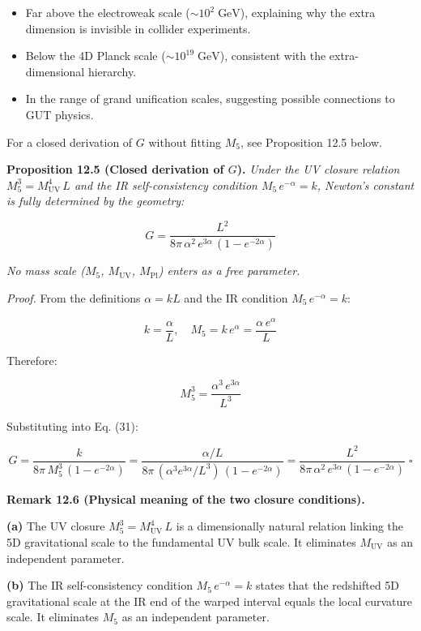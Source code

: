 \documentclass[
  11pt,
]{article}
\providecommand{\tightlist}{%
  \setlength{\itemsep}{0pt}\setlength{\parskip}{0pt}}
\begin{document}
\begin{itemize}
\tightlist
\item
  Far above the electroweak scale (\(\sim 10^2\;\text{GeV}\)),
  explaining why the extra dimension is invisible in collider
  experiments.
\item
  Below the 4D Planck scale (\(\sim 10^{19}\;\text{GeV}\)), consistent
  with the extra-dimensional hierarchy.
\item
  In the range of grand unification scales, suggesting possible
  connections to GUT physics.
\end{itemize}

For a closed derivation of \(G\) without fitting \(M_5\), see
Proposition 12.5 below.

\textbf{Proposition 12.5 (Closed derivation of \(G\)).} \emph{Under the
UV closure relation \(M_5^3 = M_{\text{UV}}^4\,L\) and the IR
self-consistency condition \(M_5\,e^{-\alpha} = k\), Newton's constant
is fully determined by the geometry:}

\[\boxed{G = \frac{L^2}{8\pi\,\alpha^2\,e^{3\alpha}\,(1 - e^{-2\alpha})}} \tag{48}\]

\emph{No mass scale (\(M_5\), \(M_{\text{UV}}\), \(M_{\text{Pl}}\))
enters as a free parameter.}

\emph{Proof.} From the definitions \(\alpha = kL\) and the IR condition
\(M_5\,e^{-\alpha} = k\):

\[k = \frac{\alpha}{L}, \quad M_5 = k\,e^{\alpha} = \frac{\alpha\,e^{\alpha}}{L} \tag{49}\]

Therefore:

\[M_5^3 = \frac{\alpha^3\,e^{3\alpha}}{L^3} \tag{50}\]

Substituting into Eq. (31):

\[G = \frac{k}{8\pi\,M_5^3\,(1 - e^{-2\alpha})} = \frac{\alpha/L}{8\pi\,(\alpha^3 e^{3\alpha}/L^3)\,(1 - e^{-2\alpha})} = \frac{L^2}{8\pi\,\alpha^2\,e^{3\alpha}\,(1 - e^{-2\alpha})} \;\square \tag{51}\]

\textbf{Remark 12.6 (Physical meaning of the two closure conditions).}

\textbf{(a)} The UV closure \(M_5^3 = M_{\text{UV}}^4\,L\) is a
dimensionally natural relation linking the 5D gravitational scale to the
fundamental UV bulk scale. It eliminates \(M_{\text{UV}}\) as an
independent parameter.

\textbf{(b)} The IR self-consistency condition \(M_5\,e^{-\alpha} = k\)
states that the redshifted 5D gravitational scale at the IR end of the
warped interval equals the local curvature scale. It eliminates \(M_5\)
as an independent parameter.
\end{document}
